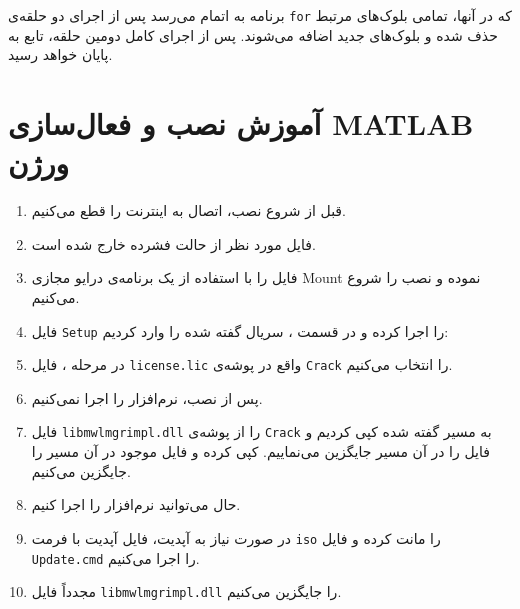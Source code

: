 برنامه به اتمام می‌رسد پس از اجرای دو حلقه‌ی \texttt{for} که در آنها، تمامی بلوک‌های مرتبط حذف شده و بلوک‌های جدید اضافه می‌شوند. پس از اجرای کامل دومین حلقه، تابع به پایان خواهد رسید.


\newpage

\section*{آموزش نصب و فعال‌سازی MATLAB ورژن }

\begin{enumerate}
	\item قبل از شروع نصب، اتصال به اینترنت را قطع می‌کنیم.
	\item فایل مورد نظر از حالت فشرده خارج شده است.
	\item فایل  را با استفاده از یک برنامه‌ی درایو مجازی Mount نموده و نصب را شروع می‌کنیم.
	\item فایل \texttt{Setup} را اجرا کرده و در قسمت ، سریال گفته شده را وارد کردیم:
	
	\item در مرحله ، فایل \texttt{license.lic} واقع در پوشه‌ی \texttt{Crack} را انتخاب می‌کنیم.
	\item پس از نصب، نرم‌افزار را اجرا نمی‌کنیم.
	\item فایل \texttt{libmwlmgrimpl.dll} را از پوشه‌ی \texttt{Crack} به مسیر گفته شده کپی کردیم و فایل را در آن مسیر جایگزین می‌نماییم.
	کپی کرده و فایل موجود در آن مسیر را جایگزین می‌کنیم.
	\item حال می‌توانید نرم‌افزار را اجرا کنیم.
	\item در صورت نیاز به آپدیت، فایل آپدیت با فرمت \texttt{iso} را مانت کرده و فایل \texttt{Update.cmd} را اجرا می‌کنیم.
	\item مجدداً فایل \texttt{libmwlmgrimpl.dll} را جایگزین می‌کنیم.
\end{enumerate}
